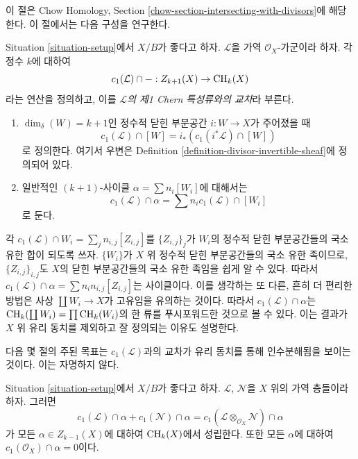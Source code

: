 \noindent
이 절은 Chow Homology, Section
\ref{chow-section-intersecting-with-divisors}에 해당한다.
이 절에서는 다음 구성을 연구한다.

\begin{definition}
\label{definition-cap-c1}
Situation \ref{situation-setup}에서 $X/B$가 좋다고 하자.
$\mathcal{L}$을 가역 $\mathcal{O}_X$-가군이라 하자.
각 정수 $k$에 대하여
$$
c_1(\mathcal{L}) \cap - :
Z_{k + 1}(X) \to \mathop{\mathrm{CH}}\nolimits_k(X)
$$
라는 연산을 정의하고, 이를 {\it $\mathcal{L}$의 제1 Chern 특성류와의
교차}라 부른다.
\begin{enumerate}
\item $\dim_\delta(W) = k + 1$인 정수적 닫힌 부분공간
$i : W \to X$가 주어졌을 때
$$
c_1(\mathcal{L}) \cap [W] = i_*(c_1({i^*\mathcal{L}}) \cap [W])
$$
로 정의한다. 여기서 우변은 Definition
\ref{definition-divisor-invertible-sheaf}에 정의되어 있다.
\item 일반적인 $(k + 1)$-사이클 $\alpha = \sum n_i [W_i]$에 대해서는
$$
c_1(\mathcal{L}) \cap \alpha = \sum n_i c_1(\mathcal{L}) \cap [W_i]
$$
로 둔다.
\end{enumerate}
\end{definition}

\noindent
각 $c_1(\mathcal{L}) \cap W_i = \sum_j n_{i, j} [Z_{i, j}]$를
$\{Z_{i, j}\}_j$가 $W_i$의 정수적 닫힌 부분공간들의 국소 유한 합이
되도록 쓰자. $\{W_i\}$가 $X$ 위 정수적 닫힌 부분공간들의 국소 유한
족이므로, $\{Z_{i, j}\}_{i, j}$도 $X$의 닫힌 부분공간들의 국소 유한
족임을 쉽게 알 수 있다. 따라서
$c_1(\mathcal{L}) \cap \alpha = \sum n_in_{i, j}[Z_{i, j}]$는
사이클이다. 이를 생각하는 또 다른, 흔히 더 편리한 방법은 사상
$\coprod W_i \to X$가 고유임을 유의하는 것이다. 따라서
$c_1(\mathcal{L}) \cap \alpha$는
$\mathop{\mathrm{CH}}\nolimits_k(\coprod W_i) = \prod \mathop{\mathrm{CH}}\nolimits_k(W_i)$의 한 류를 푸시포워드한
것으로 볼 수 있다. 이는 결과가 $X$ 위 유리 동치를 제외하고
잘 정의되는 이유도 설명한다.

\medskip\noindent
다음 몇 절의 주된 목표는 $c_1(\mathcal{L})$과의 교차가 유리 동치를
통해 인수분해됨을 보이는 것이다. 이는 자명하지 않다.

\begin{lemma}
\label{lemma-c1-cap-additive}
Situation \ref{situation-setup}에서 $X/B$가 좋다고 하자.
$\mathcal{L}$, $\mathcal{N}$을 $X$ 위의 가역 층들이라 하자. 그러면
$$
c_1(\mathcal{L}) \cap \alpha  + c_1(\mathcal{N}) \cap \alpha =
c_1(\mathcal{L} \otimes_{\mathcal{O}_X} \mathcal{N}) \cap \alpha
$$
가 모든 $\alpha \in Z_{k - 1}(X)$에 대하여 $\mathop{\mathrm{CH}}\nolimits_k(X)$에서 성립한다.
또한 모든 $\alpha$에 대하여 $c_1(\mathcal{O}_X) \cap \alpha = 0$이다.
\end{lemma}

